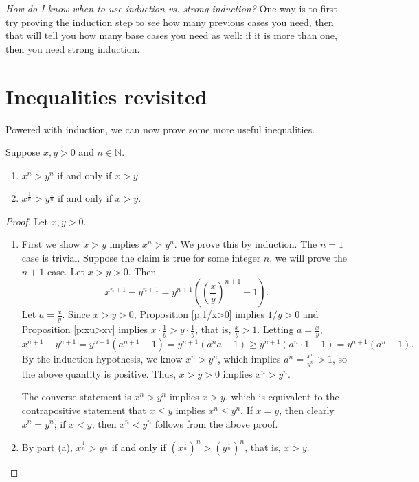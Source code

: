 \documentclass[11pt,dvipsnames]{book}
\numberwithin{equation}{section} %
\numberwithin{figure}{section} %
\numberwithin{table}{section} %
\begin{document}
\begin{protip}
{\it How do I know when to use induction vs. strong induction?} One way is to first try proving the induction step to see how many previous cases you need, then that will tell you how many base cases you need as well: if it is more than one, then you need strong induction. 
\end{protip}

\section{Inequalities revisited}

Powered with induction, we can now prove some more useful inequalities. 

\begin{proposition}
Suppose $x,y>0$ and $n\in\mathbb{N}$.
\begin{enumerate}[label=(\alph*)]
\item $x^n>y^n$ if and only if $x>y$. 
\item $x^{\frac{1}{n}}>y^{\frac{1}{n}}$ if and only if $x>y$. 
\end{enumerate}
\end{proposition}

\begin{proof}
Let $x,y>0$.
\begin{enumerate}[label=(\alph*)]
\item First we show $x>y$ implies $x^n>y^n$. We prove this by induction. The $n=1$ case is trivial. Suppose the claim is true for some integer $n$, we will prove the $n+1$ case. Let $x>y>0$. Then
\[
x^{n+1}-y^{n+1}
=y^{n+1}\left(\left(\frac{x}{y}\right)^{n+1}-1\right).
\]
Let $a=\frac{x}{y}$. Since $x>y>0$, Proposition \ref{p:1/x>0} implies $1/y>0$ and  Proposition \ref{p:xu>xv} implies $x\cdot \frac{1}{y}>y\cdot\frac{1}{y}$, that is, $\frac{x}{y}>1$. Letting $a=\frac{x}{y}$, 
\[
x^{n+1}-y^{n+1}
=y^{n+1}\left(a^{n+1}-1\right)
=y^{n+1}(a^{n}a-1)
\geq y^{n+1}(a^{n}\cdot 1-1)
= y^{n+1}(a^{n}-1).
\]
By the induction hypothesis, we know $x^n>y^n$, which implies $a^{n}=\frac{x^{n}}{y^{n}}>1$, so the above quantity is positive. Thus, $x>y>0$ implies $x^n>y^n$. 

The converse statement is $x^n>y^n$ implies $x>y$, which is equivalent to the contrapositive statement that $x\leq y$ implies $x^{n}\leq y^{n}$. If $x=y$, then clearly $x^n=y^n$; if $x<y$, then $x^n<y^n$ follows from the above proof.

\item By part (a), $x^{\frac{1}{n}}>y^{\frac{1}{n}}$ if and only if $(x^{\frac{1}{n}})^{n}>(y^{\frac{1}{n}})^{n}$, that is, $x>y$.
\end{enumerate}
\end{proof}
\end{document}
